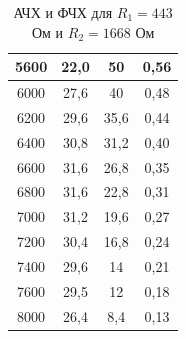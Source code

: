 \documentclass[a4paper, 12pt]{article}
\begin{document}
\begin{table}[h]
\begin{tabular}{|c|c|c|c|}
                5600 & 22,0 & 50 & 0,56 \\ \hline
                6000 & 27,6 & 40 & 0,48 \\ \hline
                6200 & 29,6 & 35,6 & 0,44 \\ \hline
                6400 & 30,8 & 31,2 & 0,40 \\ \hline
                6600 & 31,6 & 26,8 & 0,35 \\ \hline
                6800 & 31,6 & 22,8 & 0,31 \\ \hline
                7000 & 31,2 & 19,6 & 0,27 \\ \hline
                7200 & 30,4 & 16,8 & 0,24 \\ \hline
                7400 & 29,6 & 14 & 0,21 \\ \hline
                7600 & 29,5 & 12 & 0,18 \\ \hline
                8000 & 26,4 & 8,4 & 0,13 \\ \hline
            \end{tabular}
            \caption{АЧХ и ФЧХ для $R_1 = 443$ Ом и $R_2 = 1668$ Ом}

        \end{table}
\end{document}
